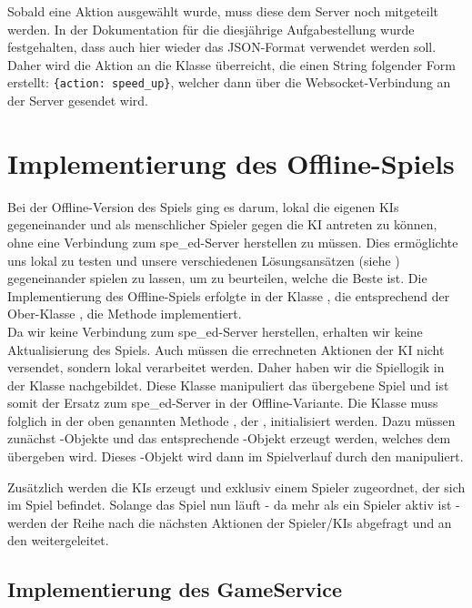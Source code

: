 Sobald eine Aktion ausgewählt wurde, muss diese dem Server noch mitgeteilt werden.
In der Dokumentation für die diesjährige Aufgabestellung wurde festgehalten, dass auch hier wieder das JSON-Format
verwendet werden soll.
Daher wird die Aktion an die Klasse  überreicht, die einen String folgender Form erstellt:
\texttt{\{\dq action\dq : \dq speed\_up\dq \}}, welcher dann über die Websocket-Verbindung an der Server gesendet wird.

\section{Implementierung des Offline-Spiels}
\label{sec:offline-implementierung}

Bei der Offline-Version des Spiels ging es darum, lokal die eigenen \ac{KI}s gegeneinander und
als menschlicher Spieler gegen die \ac{KI} antreten zu können, ohne eine Verbindung zum spe\_ed-Server herstellen zu
müssen.
Dies ermöglichte uns lokal zu testen und unsere verschiedenen Lösungsansätzen (siehe )
gegeneinander spielen zu lassen, um zu beurteilen, welche die Beste ist.
Die Implementierung des Offline-Spiels erfolgte in der Klasse , die entsprechend der Ober-Klasse
, die Methode  implementiert. \\

Da wir keine Verbindung zum spe\_ed-Server herstellen, erhalten wir keine Aktualisierung des Spiels.
Auch müssen die errechneten Aktionen der \ac{KI} nicht versendet, sondern lokal verarbeitet werden.
Daher haben wir die Spiellogik in der Klasse  nachgebildet.
Diese Klasse manipuliert das übergebene Spiel und ist somit der Ersatz zum spe\_ed-Server in der Offline-Variante.
Die Klasse  muss folglich in der oben genannten Methode , der ,
initialisiert werden.
Dazu müssen zunächst -Objekte und das entsprechende -Objekt erzeugt werden, welches dem
 übergeben wird.
Dieses -Objekt wird dann im Spielverlauf durch den  manipuliert.

Zusätzlich werden die \ac{KI}s erzeugt und exklusiv einem Spieler zugeordnet, der sich im Spiel befindet.
Solange das Spiel nun läuft - da mehr als ein Spieler aktiv ist - werden der Reihe nach die nächsten Aktionen der
Spieler/\ac{KI}s abgefragt und an den  weitergeleitet.

\subsection{Implementierung des GameService}
\label{subsec:game-service}

